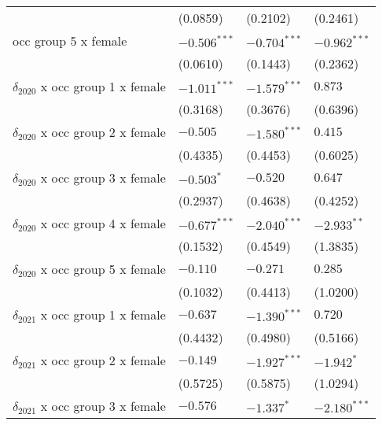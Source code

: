 \begin{tabular}{llll}
                                       &           (0.0859) &           (0.2102) &           (0.2461) \\
occ group 5 x female                   &     $-0.506^{***}$ &     $-0.704^{***}$ &     $-0.962^{***}$ \\
                                       &           (0.0610) &           (0.1443) &           (0.2362) \\
$\delta_{2020}$ x occ group 1 x female &     $-1.011^{***}$ &     $-1.579^{***}$ &            $0.873$ \\
                                       &           (0.3168) &           (0.3676) &           (0.6396) \\
$\delta_{2020}$ x occ group 2 x female &           $-0.505$ &     $-1.580^{***}$ &            $0.415$ \\
                                       &           (0.4335) &           (0.4453) &           (0.6025) \\
$\delta_{2020}$ x occ group 3 x female &         $-0.503^*$ &           $-0.520$ &            $0.647$ \\
                                       &           (0.2937) &           (0.4638) &           (0.4252) \\
$\delta_{2020}$ x occ group 4 x female &     $-0.677^{***}$ &     $-2.040^{***}$ &      $-2.933^{**}$ \\
                                       &           (0.1532) &           (0.4549) &           (1.3835) \\
$\delta_{2020}$ x occ group 5 x female &           $-0.110$ &           $-0.271$ &            $0.285$ \\
                                       &           (0.1032) &           (0.4413) &           (1.0200) \\
$\delta_{2021}$ x occ group 1 x female &           $-0.637$ &     $-1.390^{***}$ &            $0.720$ \\
                                       &           (0.4432) &           (0.4980) &           (0.5166) \\
$\delta_{2021}$ x occ group 2 x female &           $-0.149$ &     $-1.927^{***}$ &         $-1.942^*$ \\
                                       &           (0.5725) &           (0.5875) &           (1.0294) \\
$\delta_{2021}$ x occ group 3 x female &           $-0.576$ &         $-1.337^*$ &     $-2.180^{***}$ \\

\end{tabular}

